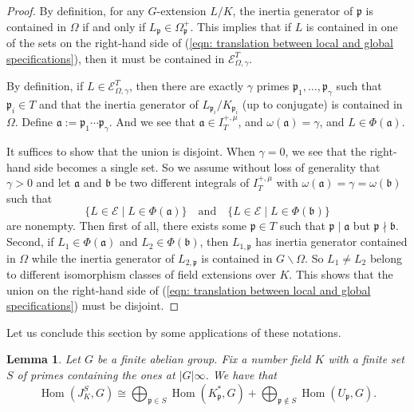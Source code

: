 \documentclass{amsart}
\numberwithin{equation}{section}
\theoremstyle{plain}
\newtheorem{lemma}[theorem]{Lemma}
\theoremstyle{definition}
\theoremstyle{remark}
\begin{document}
\begin{proof}
	By definition, for any $G$-extension $L/K$, the inertia generator of $\mathfrak{p}$ is contained in $\Omega$ if and only if $L_{\mathfrak{p}}\in\Omega^{+}_{\mathfrak{p}}$.
	This implies that if $L$ is contained in one of the sets on the right-hand side of (\ref{eqn: translation between local and global specifications}), then it must be contained in $\mathcal{E}_{\Omega,\gamma}^{T}$.
	
	By definition, if $L\in\mathcal{E}_{\Omega,\gamma}^{T}$, then there are exactly $\gamma$ primes $\mathfrak{p}_1,\dots,\mathfrak{p}_{\gamma}$ such that $\mathfrak{p}_i\in T$ and that the inertia generator of $L_{\mathfrak{p}_i}/K_{\mathfrak{p}_i}$ (up to conjugate) is contained in $\Omega$.
	Define $\mathfrak{a}:=\mathfrak{p}_1\cdots\mathfrak{p}_{\gamma}$.
	And we see that $\mathfrak{a}\in I^{+,\mu}_T$, and $\omega(\mathfrak{a})=\gamma$, and $L\in\Phi(\mathfrak{a})$.
	
	It suffices to show that the union is disjoint.
        When $\gamma=0$, we see that the right-hand side becomes a single set.
	So we assume without loss of generality that $\gamma>0$ and let $\mathfrak{a}$ and $\mathfrak{b}$ be two different integrals of $ I^{+,\mu}_T$ with $\omega(\mathfrak{a})=\gamma=\omega(\mathfrak{b})$ such that
	\begin{equation*}
		\{L\in\mathcal{E}\mid L\in\Phi(\mathfrak{a})\}
		\quad\text{and}\quad
		\{L\in\mathcal{E}\mid L\in\Phi(\mathfrak{b})\}
	\end{equation*}
	are nonempty.
	Then first of all, there exists some $\mathfrak{p}\in T$ such that $\mathfrak{p}\mid\mathfrak{a}$ but $\mathfrak{p}\nmid\mathfrak{b}$.
	Second, if $L_1\in\Phi(\mathfrak{a})$ and $L_2\in\Phi(\mathfrak{b})$, then $L_{1,\mathfrak{p}}$ has inertia generator contained in $\Omega$ while the inertia generator of $L_{2,\mathfrak{p}}$ is contained in $G\backslash\Omega$.
	So $L_{1}\neq L_2$ belong to different isomorphism classes of field extensions over $K$.
	This shows that the union on the right-hand side of (\ref{eqn: translation between local and global specifications}) must be disjoint.
\end{proof}
Let us conclude this section by some applications of these notations.
\begin{lemma}\label{lemma: Hom(J_K,G)}
    Let $G$ be a finite abelian group.
    Fix a number field $K$ with a finite set $S$ of primes containing the ones at $\lvert G\rvert\infty$.
    We have that
	\begin{equation*}
		\operatorname{Hom}(J_K^S,G)\cong\bigoplus_{\mathfrak{p}\in S}\operatorname{Hom}(K_{\mathfrak{p}}^*,G)+\bigoplus_{\mathfrak{p}\notin S}\operatorname{Hom}(U_{\mathfrak{p}},G).
	\end{equation*}
\end{lemma}
\end{document}
